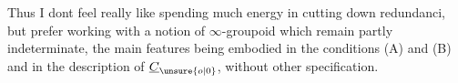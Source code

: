 Thus I dont feel really like spending much energy in cutting down redundanci, but prefer working with a notion of $\infty$-groupoid which remain partly indeterminate, the main features being embodied in the conditions (A) and (B) and in the description of $\underline{C}_{\unsure{o|0}}$, without other specification.

